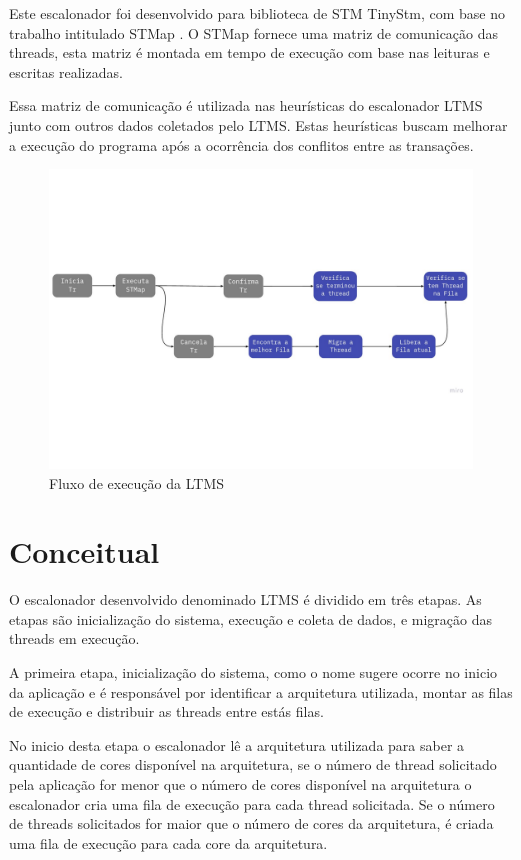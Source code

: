 \documentclass[diss,capa]{texufpel}
\begin{document}
Este escalonador foi desenvolvido para biblioteca de STM TinyStm, com base no trabalho intitulado STMap . O STMap fornece uma matriz de comunicação  das threads, esta matriz é montada em tempo de execução com base nas leituras e escritas realizadas.

Essa matriz de comunicação é utilizada nas heurísticas do escalonador LTMS junto com outros dados coletados pelo LTMS. Estas heurísticas buscam melhorar a execução do programa após a ocorrência dos conflitos entre as transações.

\begin{figure}[htbp]
  \centering \includegraphics[scale=.5]{images/lstm}
\caption{Fluxo de execução da LTMS} 
\label{LTMS}
\end{figure}

\section{\textbf{Conceitual}}

O escalonador desenvolvido denominado LTMS é dividido em três etapas. As etapas são inicialização do sistema, execução e coleta de dados, e migração das threads em execução.

A primeira etapa, inicialização do sistema, como o nome sugere ocorre no inicio da aplicação e é responsável por identificar a arquitetura utilizada, montar as filas de execução e distribuir as threads entre estás filas.

No inicio desta etapa o escalonador lê a arquitetura utilizada para saber a quantidade de cores disponível na arquitetura, se o número de thread solicitado pela aplicação for menor que o número de cores disponível na arquitetura o escalonador cria uma fila de execução para cada thread solicitada. Se o número de threads solicitados for maior que o número de cores da arquitetura, é criada uma fila de execução para cada core da arquitetura.
\end{document}
